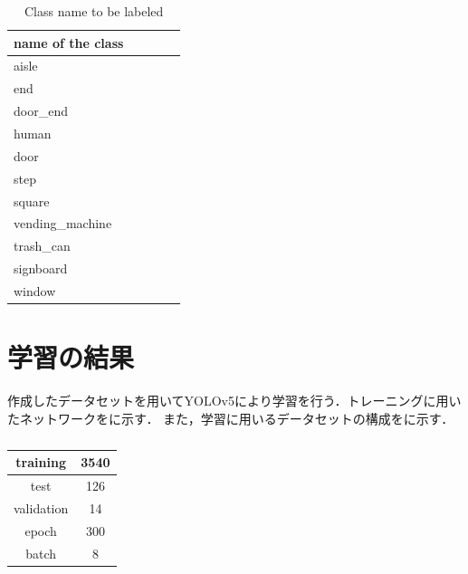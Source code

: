 \documentclass[../main]{subfiles}
\begin{document}
        \begin{table}[H]
            \caption{Class name to be labeled}
            \centering
            \label{table::datasets_table}
            \begin{tabular}{lllll}
            \hline
            name of the class &  &  &  &  \\ 
            \hline \hline
            aisle             &  &  &  &  \\
            end               &  &  &  &  \\
            door\_end         &  &  &  &  \\
            human             &  &  &  &  \\
            door              &  &  &  &  \\
            step              &  &  &  &  \\
            square            &  &  &  &  \\
            vending\_machine  &  &  &  &  \\
            trash\_can        &  &  &  &  \\
            signboard         &  &  &  &  \\
            window            &  &  &  &  \\ 
            \hline
            \end{tabular}
        \end{table}            

        \section{学習の結果}
        作成したデータセットを用いてYOLOv5により学習を行う．トレーニングに用いたネットワークをに示す．
        また，学習に用いるデータセットの構成をに示す．

        \begin{table}[H]
            \caption{}
            \centering
            \label{table::learning}
            \begin{tabular}{l|l}
            \hline
            \multicolumn{1}{c|}{training}   & \multicolumn{1}{c|}{3540}                \\ \hline
            \multicolumn{1}{c|}{test}       & \multicolumn{1}{c|}{126}                  \\ \hline
            \multicolumn{1}{c|}{validation} & \multicolumn{1}{c|}{14}                  \\ \hline
            \multicolumn{1}{c|}{epoch}      & \multicolumn{1}{c|}{300}                \\ \hline
            \multicolumn{1}{c|}{batch}      & \multicolumn{1}{c|}{8}                   \\ \hline
            \end{tabular}
        \end{table}
\end{document}
